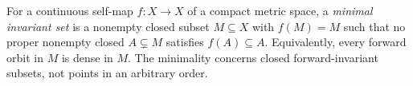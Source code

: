 
For a continuous self-map $f:X\to X$ of a compact metric space, a \emph{minimal invariant set} is a nonempty closed subset $M\subseteq X$ with $f(M)=M$ such that no proper nonempty closed $A\subsetneq M$ satisfies $f(A)\subseteq A$. Equivalently, every forward orbit in $M$ is dense in $M$. The minimality concerns closed forward-invariant subsets, not points in an arbitrary order.
